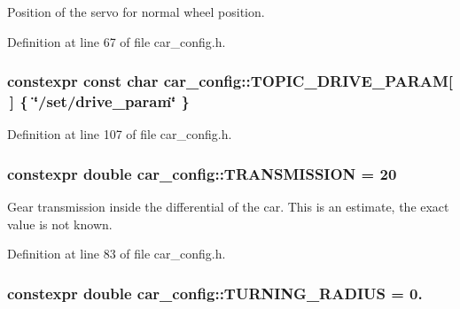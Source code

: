 Position of the servo for normal wheel position. 



Definition at line 67 of file car\+\_\+config.\+h.

\subsubsection[{\texorpdfstring{T\+O\+P\+I\+C\+\_\+\+D\+R\+I\+V\+E\+\_\+\+P\+A\+R\+AM}{TOPIC_DRIVE_PARAM}}]{\setlength{\rightskip}{0pt plus 5cm}constexpr const char car\+\_\+config\+::\+T\+O\+P\+I\+C\+\_\+\+D\+R\+I\+V\+E\+\_\+\+P\+A\+R\+AM\mbox{[}$\,$\mbox{]} \{ \char`\"{}/set/drive\+\_\+param\char`\"{} \}}\hypertarget{namespacecar__config_a329dea882fb03eb1cec1af42977fa0c6}{}\label{namespacecar__config_a329dea882fb03eb1cec1af42977fa0c6}


Definition at line 107 of file car\+\_\+config.\+h.

\subsubsection[{\texorpdfstring{T\+R\+A\+N\+S\+M\+I\+S\+S\+I\+ON}{TRANSMISSION}}]{\setlength{\rightskip}{0pt plus 5cm}constexpr double car\+\_\+config\+::\+T\+R\+A\+N\+S\+M\+I\+S\+S\+I\+ON = 20}\hypertarget{namespacecar__config_a7af97a6c9168673aba8917029cfe44d3}{}\label{namespacecar__config_a7af97a6c9168673aba8917029cfe44d3}


Gear transmission inside the differential of the car. This is an estimate, the exact value is not known. 



Definition at line 83 of file car\+\_\+config.\+h.

\subsubsection[{\texorpdfstring{T\+U\+R\+N\+I\+N\+G\+\_\+\+R\+A\+D\+I\+US}{TURNING_RADIUS}}]{\setlength{\rightskip}{0pt plus 5cm}constexpr double car\+\_\+config\+::\+T\+U\+R\+N\+I\+N\+G\+\_\+\+R\+A\+D\+I\+US = 0.}\hypertarget{namespacecar__config_afe308ba7ae07f7bd5af7e79a095101a9}{}\label{namespacecar__config_afe308ba7ae07f7bd5af7e79a095101a9}


